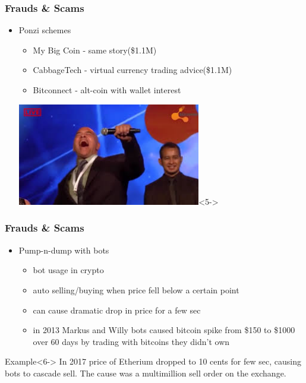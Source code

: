 \documentclass{beamer}
\begin{document}
\begin{frame}
    \frametitle{Frauds \& Scams}
    \begin{itemize}
        \item<1-> Ponzi schemes
        \begin{itemize}
            \item<2-> My Big Coin - same story(\$1.1M)
            \item<3-> CabbageTech - virtual currency trading advice(\$1.1M)
            \item<4-> Bitconnect - alt-coin with wallet interest
        \end{itemize}
        \begin{center}
            \includegraphics[width=80mm]{connect.jpeg}<5->
        \end{center}        
    \end{itemize}
\end{frame}

\begin{frame}
    \frametitle{Frauds \& Scams}
    \begin{itemize}
        \item<1-> Pump-n-dump with bots
        \begin{itemize}
            \item<2-> bot usage in crypto
            \item<3-> auto selling/buying when price fell below a certain point
            \item<4-> can cause dramatic drop in price for a few sec
            \item<5-> in 2013 Markus and Willy bots caused bitcoin spike from \$150 to \$1000 over 60 days by trading with bitcoins they didn't own
        \end{itemize}
    \end{itemize}
    \vspace{10pt}
    \begin{exampleblock}{Example}<6->
        In 2017 price of Etherium dropped to 10 cents for few sec, causing bots to cascade sell. The cause was a multi\-million sell order on the exchange.   
    \end{exampleblock}     
\end{frame}
\end{document}
